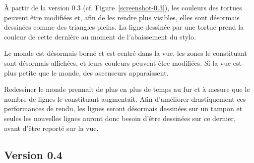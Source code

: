 À partir de la version 0.3 (cf. Figure~\ref{screenshot-0.3}), les couleurs des tortues peuvent être modifiées et, afin de les rendre plus visibles, elles sont désormais dessinées comme des triangles pleins. La ligne dessinée par une tortue prend la couleur de cette dernière au moment de l'abaissement du stylo.

Le monde est désormais borné et est centré dans la vue, les zones le constituant sont désormais affichées, et leurs couleurs peuvent être modifiées. Si la vue est plus petite que le monde, des ascenseurs apparaissent.

Redessiner le monde prennait de plus en plus de temps au fur et à mesure que le nombre de lignes le constituant augmentait. Afin d'améliorer drastiquement ces performances de rendu, les lignes seront désormais dessinées sur un tampon et seules les nouvelles lignes auront donc besoin d'être dessinées sur ce dernier, avant d'être reporté sur la vue.

\subsection{Version 0.4}


